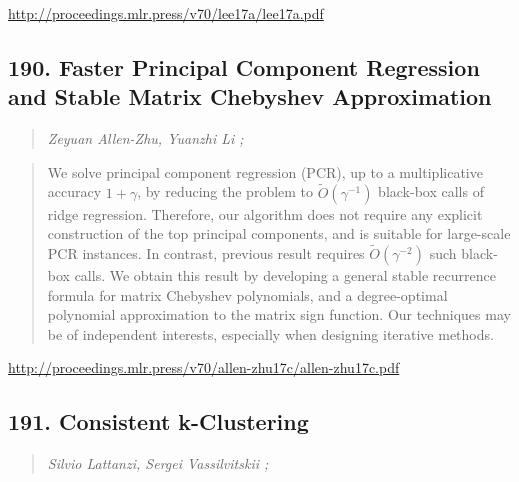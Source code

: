 \documentclass{article}
\begin{document}
\href{http://proceedings.mlr.press/v70/lee17a/lee17a.pdf}{http://proceedings.mlr.press/v70/lee17a/lee17a.pdf}

\subsection{190. Faster Principal Component Regression and Stable Matrix Chebyshev Approximation}

\begin{quote}
\footnotesize{\textit{Zeyuan Allen-Zhu, Yuanzhi Li ;}}

\end{quote}

\begin{quote}
    We solve principal component regression (PCR), up to a multiplicative accuracy $1+\gamma$, by reducing the problem to $\tilde{O}(\gamma^{-1})$ black-box calls of ridge regression. Therefore, our algorithm does not require any explicit construction of the top principal components, and is suitable for large-scale PCR instances. In contrast, previous result requires $\tilde{O}(\gamma^{-2})$ such black-box calls. We obtain this result by developing a general stable recurrence formula for matrix Chebyshev polynomials, and a degree-optimal polynomial approximation to the matrix sign function. Our techniques may be of independent interests, especially when designing iterative methods.  
\end{quote}

\href{http://proceedings.mlr.press/v70/allen-zhu17c/allen-zhu17c.pdf}{http://proceedings.mlr.press/v70/allen-zhu17c/allen-zhu17c.pdf}

\subsection{191. Consistent k-Clustering}

\begin{quote}
\footnotesize{\textit{Silvio Lattanzi, Sergei Vassilvitskii ;}}

\end{quote}
\end{document}
